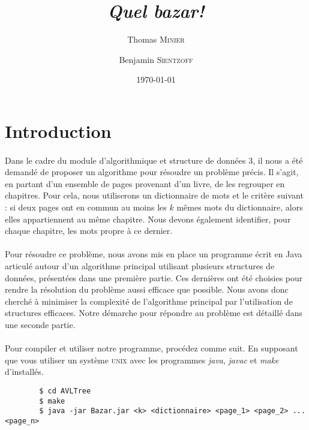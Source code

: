 \documentclass[a4paper]{article}
\title{\textit{Quel bazar!}}
\author{Thomas \textsc{Minier} \and Benjamin \textsc{Sientzoff}}
\date{\today}
\begin{document}
	\maketitle
	\vspace{5cm}
	\tableofcontents
	\newpage %
	
	\section*{Introduction}

		\paragraph{}{
		Dans le cadre du module d'algorithmique et structure de données 3, il nous a été demandé de 
		proposer un algorithme pour résoudre un problème précis. Il s'agit, en partant d'un ensemble 
		de pages provenant d'un livre, de les regrouper en chapitres. Pour cela, nous utiliserons 
		un dictionnaire de mots et le critère suivant : si deux pages ont en commun au moins les 
		$k$ mêmes mots du dictionnaire, alors elles appartiennent au même chapitre. \newline
		Nous devons également identifier, pour chaque chapitre, les mots propre à ce dernier.
		}
		
		\paragraph{}{
		Pour résoudre ce problème, nous avons mis en place un programme écrit en Java articulé autour 
		d'un algorithme principal utilisant plusieurs structures de données, présentées dans une
		première partie. Ces dernières ont été choisies pour rendre la résolution du problème 
		aussi efficace que possible. Nous avons donc cherché à minimiser la complexité de 
		l'algorithme principal par l'utilisation de structures efficaces. Notre démarche pour répondre
		au problème est détaillé dans une seconde partie.
		}
		
		\paragraph{}{
		Pour compiler et utiliser notre programme, procédez comme suit. En supposant que vous utiliser
		un système \textsc{unix} avec les programmes \textit{java}, \textit{javac} et \textit{make} d'installés.
		\begin{verbatim}
		$ cd AVLTree
		$ make
		$ java -jar Bazar.jar <k> <dictionnaire> <page_1> <page_2> ... <page_n>
		\end{verbatim}
		}
		
\end{document}
